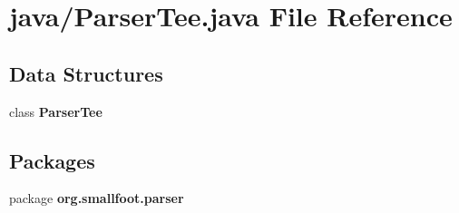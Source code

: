 \section{java/\+Parser\+Tee.java File Reference}
\label{ParserTee_8java}
\subsection*{Data Structures}
\begin{DoxyCompactItemize}
\item 
class {\bf Parser\+Tee}
\end{DoxyCompactItemize}
\subsection*{Packages}
\begin{DoxyCompactItemize}
\item 
package {\bf org.\+smallfoot.\+parser}
\end{DoxyCompactItemize}
